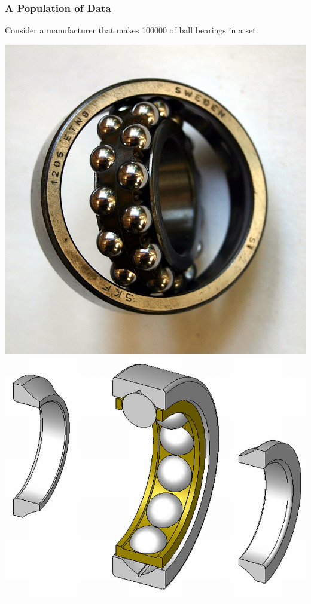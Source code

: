 \documentclass[fleqn]{beamer} %
\newcommand{\sectionIsubsectionItitle}{A Population of Data}
\begin{document}
			\begin{frame}
				\frametitle{\sectionIsubsectionItitle}

				Consider a manufacturer that makes 100000 of ball bearings in a set. \vspace{3mm}

				\includegraphics[scale=.1]{images/bearing_fig1.jpg} \hspace{10mm}
				\includegraphics[scale=.1]{images/bearing_fig2.png} \hspace{10mm}

\end{frame}
\end{document}
